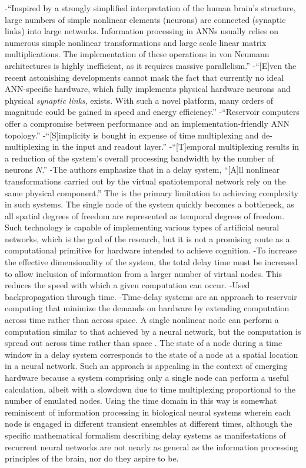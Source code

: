 \vspace{3em}
\cite{brpe2018}
-``Inspired by a strongly simplified interpretation of the human brain's structure, large numbers of simple nonlinear elements (neurons) are connected (synaptic links) into large networks. Information processing in ANNs usually relies on numerous simple nonlinear transformations and large scale linear matrix multiplications. The implementation of these operations in von Neumann architectures is highly inefficient, as it requires massive parallelism.''
-``[E]ven the recent astonishing developments cannot mask the fact that currently no ideal ANN-specific hardware, which fully implements physical hardware neurons and physical \textit{synaptic links}, exists. With such a novel platform, many orders of magnitude could be gained in speed and energy efficiency.''
-``Reservoir computers offer a compromise between performance and an implementation-friendly ANN topology.''
-``[S]implicity is bought in expense of time multiplexing and de-multiplexing in the input and readout layer.'' 
-``[T]emporal multiplexing results in a reduction of the system's overall processing bandwidth by the number of neurons $N$.''
-The authors emphasize that in a delay system, ``[A]ll nonlinear transformations carried out by the virtual spatiotemporal network rely on the same physical component.'' The is the primary limitation to achieving complexity in such systems. The single node of the system quickly becomes a bottleneck, as all spatial degrees of freedom are represented as temporal degrees of freedom. Such technology is capable of implementing various types of artificial neural networks, which is the goal of the research, but it is not a promising route as a computational primitive for hardware intended to achieve cognition.
-To increase the effective dimensionality of the system, the total delay time must be increased to allow inclusion of information from a larger number of virtual nodes. This reduces the speed with which a given computation can occur.
-Used backpropagation through time.
-Time-delay systems are an approach to reservoir computing that minimize the demands on hardware by extending computation across time rather than across space. A single nonlinear node can perform a computation similar to that achieved by a neural network, but the computation is spread out across time rather than space \cite{brpe2018}. The state of a node during a time window in a delay system corresponds to the state of a node at a spatial location in a neural network. Such an approach is appealing in the context of emerging hardware because a system comprising only a single node can perform a useful calculation, albeit with a slowdown due to time multiplexing proportional to the number of emulated nodes. Using the time domain in this way is somewhat reminiscent of information processing in biological neural systems wherein each node is engaged in different transient ensembles at different times, although the specific mathematical formalism describing delay systems as manifestations of recurrent neural networks are not nearly as general as the information processing principles of the brain, nor do they aspire to be.

